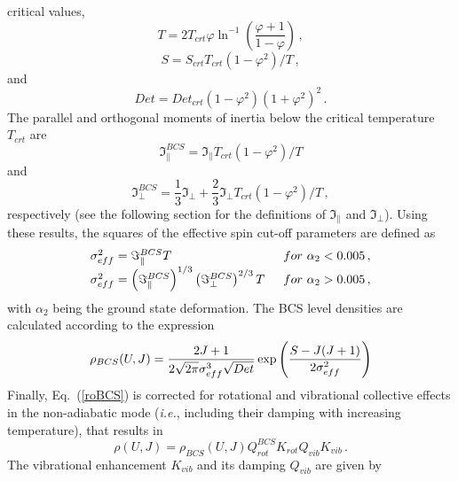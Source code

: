 critical values,
\begin{equation}
T=2T_{crt}\varphi\ln^{-1}\left(\frac{\varphi+1}{1-\varphi}\right)\,,
\label{Tign}
\end{equation}
\begin{equation}
S=S_{crt}T_{crt}(1-\varphi^{2})/T\,,  \label{Sign}
\end{equation}
and
\begin{equation}
Det=Det_{crt}(1-\varphi^{2})(1+\varphi^{2})^{2}\,.  \label{Detign}
\end{equation}
The parallel and orthogonal moments of inertia below the critical
temperature $T_{crt}$ are
\begin{equation}
\Im_{\parallel}^{BCS}=\Im_{\parallel}T_{crt}(1-\varphi^{2})/T
\label{momparign}
\end{equation}
and
\begin{equation}
\Im_{\perp}^{BCS}=\frac{1}{3}\Im_{\perp}+\frac{2}{3}\Im_{\perp}T_{crt}(1-%
\varphi^{2})/T\,,  \label{momortign}
\end{equation}
respectively (see the following section for the definitions of $%
\Im_{\parallel}$ and $\Im_{\perp}$). Using these results, the squares of the
effective spin cut-off parameters are defined as
\begin{equation}
\begin{array}{ll}
\sigma_{eff}^{2}=\Im_{\parallel}^{BCS}T & \,\,\, for\,\,\alpha_{2}<0.005\,,
\\
\sigma_{eff}^{2}=\left(\Im_{\parallel}^{BCS}\right)^{1/3}\left(\Im_{%
\perp}^{BCS}\right)^{2/3}T & \,\,\, for\,\,\alpha_{2}>0.005\,,%
\end{array}
\label{sigeffign}
\end{equation}
with $\alpha_{2}$ being the ground state deformation. The BCS%
 level densities%
 are calculated according to the expression
\begin{equation}
\rho_{BCS}(U,J)=%
\frac{2J+1}{2\sqrt{2\pi}\sigma_{eff}^{3}\sqrt{Det}}\exp\left(\frac{S-J(J+1)}{%
2\sigma_{eff}^{2}}\right)  \label{roBCS}
\end{equation}
Finally, Eq.~(\ref{roBCS}) is corrected for rotational and vibrational
collective effects in the non-adiabatic mode (\textit{i.e.}, including their
damping with increasing temperature), that results in
\begin{equation}
\rho(U,J)=\rho_{BCS}(U,J)Q_{rot}^{BCS}K_{rot}Q_{vib}K_{vib}\,.
\label{roBCScol}
\end{equation}
The vibrational enhancement $K_{vib}$ and its damping $Q_{vib}$ are given by
